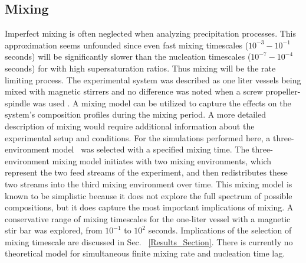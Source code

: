 \documentclass[preprint,3p,a4paper,times,12pt,authoryear]{elsarticle}
\begin{document}
\subsection{Mixing}
\label{mixing}
Imperfect mixing is often neglected when analyzing precipitation processes. This approximation seems unfounded since even fast mixing timescales ($10^{-3}-10^{-1}$ seconds) will be significantly slower than the nucleation timescales ($10^{-7}-10^{-4}$ seconds) for  with high supersaturation ratios.  Thus mixing will be the rate limiting process. The experimental system was described as one liter vessels being mixed with magnetic stirrers and no difference was noted when a screw propeller-spindle was used \citep{Ogino1987}.  A mixing model can be utilized to capture the effects on the system's composition profiles during the mixing period.  A more detailed description of mixing would require additional information about the experimental setup and conditions. For the simulations performed here, a three-environment model~\citep{Fox2003} was selected with a specified mixing time.  The three-environment mixing model initiates with two mixing environments, which represent the two feed streams of the experiment, and then redistributes these two streams into the third mixing environment over time. This mixing model is known to be simplistic because it does not explore the full spectrum of possible compositions, but it does capture the most important implications of mixing.  A conservative range of mixing timescales for the one-liter vessel with a magnetic stir bar was explored, from $10^{-1}$ to $10^2$ seconds. Implications of the selection of mixing timescale are discussed in Sec.~ \ref{Results_Section}.  There is currently no theoretical model for simultaneous finite mixing rate and nucleation time lag.
\end{document}
